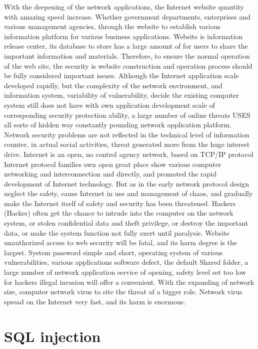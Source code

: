 \documentclass[letterpaper,12pt]{article}
\begin{document}
With the deepening of the network applications, the Internet website quantity with amazing speed
increase. Whether government departments, enterprises and various management agencies, through the
website to establish various information platform for various business applications. Website is
information release center, its database to store has a large amount of for users to share the important
information and materials. Therefore, to ensure the normal operation of the web site, the security is
website construction and operation process should be fully considered important issues. Although the
Internet application scale developed rapidly, but the complexity of the network environment, and
information system, variability of vulnerability, decide the existing computer system still does not have
with own application development scale of corresponding security protection ability, a large number of
online threats USES all sorts of hidden way constantly pounding network application platform.
Network security problems are not reflected in the technical level of information counter, in actual
social activities, threat generated more from the huge interest drive. 
Internet is an open, no control agency network, based on TCP/IP protocol Internet protocol families
own open great place show various computer networking and interconnection and directly, and
promoted the rapid development of Internet technology. But as in the early network protocol design
neglect the safety, cause Internet in use and management of chaos, and gradually make the Internet
itself of safety and security has been threatened. Hackers (Hacker) often get the chance to intrude into
the computer on the network system, or stolen confidential data and theft privilege, or destroy the
important data, or make the system function not fully exert until paralysis.
Website unauthorized access to web security will be fatal, and its harm degree is the largest.
System password simple and short, operating system of various vulnerabilities, various applications
software defect, the default Shared folder, a large number of network application service of opening,
safety level set too low for hackers illegal invasion will offer a convenient. 
With the expanding of network size, computer network virus to site the threat of a bigger role. Network
virus spread on the Internet very fast, and its harm is enormous. 




\section{SQL injection}
\end{document}
